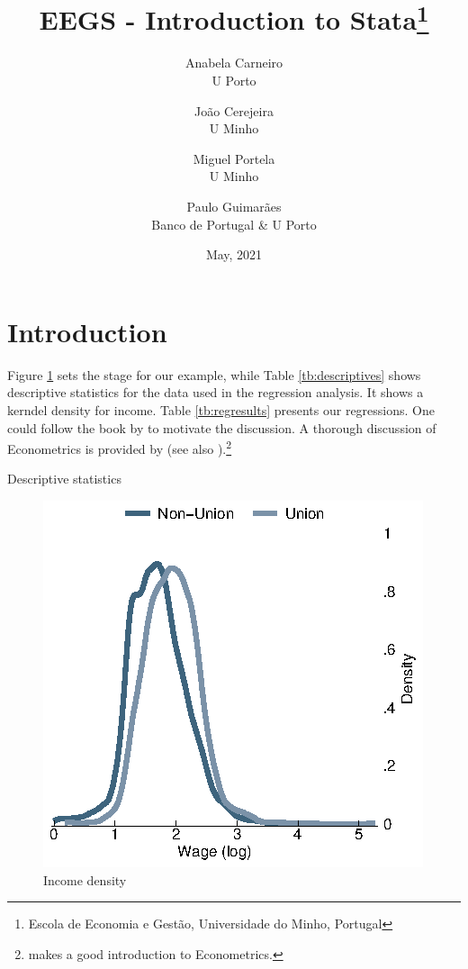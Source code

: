\documentclass[a4paper,12pt]{article}
\title{EEGS - Introduction to Stata\thanks{Escola de Economia e Gestão, Universidade do Minho, Portugal}}
\date{May, 2021}
\author{Anabela Carneiro\\ U Porto
\and João Cerejeira \\ U Minho
\and Miguel Portela \\ U Minho 
\and Paulo Guimarães \\ Banco de Portugal \& U Porto}
\begin{document}
\maketitle

\section{Introduction}\label{sec:intro}

Figure \ref{fig:incdensity} sets the stage for our example, while Table \ref{tb:descriptives} shows descriptive statistics for the data used in the regression analysis. It shows a kerndel density for income. Table \ref{tb:regresults} presents our regressions. One could follow the book by \cite{acemoglu2016} to motivate the discussion. A thorough discussion of Econometrics is provided by \cite{greene2017} (see also \citep{verbeek2012}).\footnote{\cite{wooldridge2015introductory} makes a good introduction to Econometrics.}

\lipsum

\begin{table}[ht]
\begin{center}
\caption{Descriptive statistics}\label{tb:descriptives}
\resizebox{0.8\textwidth}{!}
	{}
\end{center}
\end{table}

\lipsum

\begin{figure}[ht]
	\begin{center}
		\includegraphics[scale = 1.0,trim = 0.0 0.0 0.0 0.0,clip]{figures/fig_wage_density_union.eps}
		\caption{Income density}\label{fig:incdensity}
	\end{center}
\end{figure}

\lipsum



\lipsum


\end{document}
